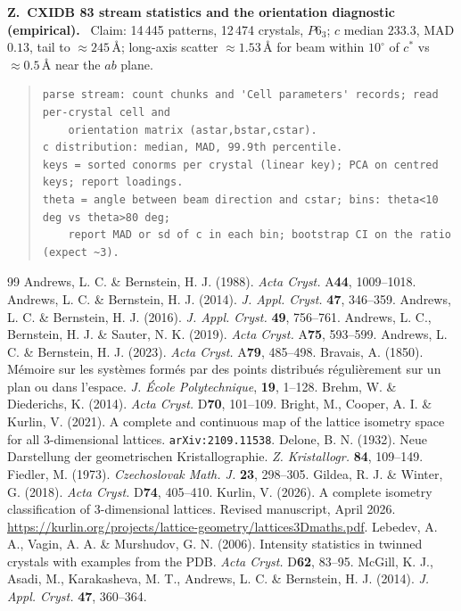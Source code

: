 \documentclass[11pt]{article}
\newcommand{\Ang}{\text{\AA}}
\newcounter{zcheck}
\renewcommand{\thezcheck}{Z.\arabic{zcheck}}
\newcommand{\zitem}[2]{\medskip\noindent\refstepcounter{zcheck}\label{#1}\textbf{\thezcheck\ #2.}\ }
\begin{document}
\zitem{z:xfel}{CXIDB 83 stream statistics and the orientation diagnostic (empirical)}
Claim: 14\,445 patterns, 12\,474 crystals, $P6_3$; $c$ median $233.3$, MAD $0.13$, tail to $\approx245\,\Ang$; long-axis scatter $\approx1.53\,\Ang$ for beam within $10^\circ$ of $c^*$ vs $\approx0.5\,\Ang$ near the $ab$ plane.
\begin{quote}\small\begin{verbatim}
parse stream: count chunks and 'Cell parameters' records; read per-crystal cell and
    orientation matrix (astar,bstar,cstar).
c distribution: median, MAD, 99.9th percentile.
keys = sorted conorms per crystal (linear key); PCA on centred keys; report loadings.
theta = angle between beam direction and cstar; bins: theta<10 deg vs theta>80 deg;
    report MAD or sd of c in each bin; bootstrap CI on the ratio (expect ~3).
\end{verbatim}\end{quote}

\begin{thebibliography}{99}
\small
{} Andrews, L. C. \& Bernstein, H. J. (1988). \textit{Acta Cryst.} A\textbf{44}, 1009--1018.
 Andrews, L. C. \& Bernstein, H. J. (2014). \textit{J. Appl. Cryst.} \textbf{47}, 346--359.
 Andrews, L. C. \& Bernstein, H. J. (2016). \textit{J. Appl. Cryst.} \textbf{49}, 756--761.
 Andrews, L. C., Bernstein, H. J. \& Sauter, N. K. (2019). \textit{Acta Cryst.} A\textbf{75}, 593--599.
 Andrews, L. C. \& Bernstein, H. J. (2023). \textit{Acta Cryst.} A\textbf{79}, 485--498.
 Bravais, A. (1850). M\'emoire sur les syst\`emes form\'es par des points distribu\'es r\'eguli\`erement sur un plan ou dans l'espace. \textit{J. \'{E}cole Polytechnique}, \textbf{19}, 1--128.
 Brehm, W. \& Diederichs, K. (2014). \textit{Acta Cryst.} D\textbf{70}, 101--109.
 Bright, M., Cooper, A. I. \& Kurlin, V. (2021). A complete and continuous map of the lattice isometry space for all 3-dimensional lattices. \texttt{arXiv:2109.11538}.
 Delone, B. N. (1932). Neue Darstellung der geometrischen Kristallographie. \textit{Z. Kristallogr.} \textbf{84}, 109--149.
 Fiedler, M. (1973). \textit{Czechoslovak Math. J.} \textbf{23}, 298--305.
 Gildea, R. J. \& Winter, G. (2018). \textit{Acta Cryst.} D\textbf{74}, 405--410.
 Kurlin, V. (2026). A complete isometry classification of 3-dimensional lattices. Revised manuscript, April 2026. \url{https://kurlin.org/projects/lattice-geometry/lattices3Dmaths.pdf}.
 Lebedev, A. A., Vagin, A. A. \& Murshudov, G. N. (2006). Intensity statistics in twinned crystals with examples from the PDB. \textit{Acta Cryst.} D\textbf{62}, 83--95.
 McGill, K. J., Asadi, M., Karakasheva, M. T., Andrews, L. C. \& Bernstein, H. J. (2014). \textit{J. Appl. Cryst.} \textbf{47}, 360--364.
\end{thebibliography}
\end{document}
